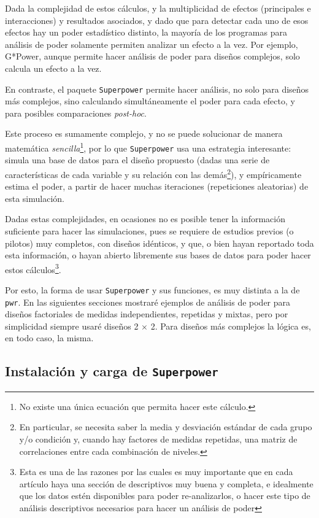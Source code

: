 \documentclass[
]{article}
\begin{document}
Dada la complejidad de estos cálculos, y la multiplicidad de efectos
(principales e interacciones) y resultados asociados, y dado que para
detectar cada uno de esos efectos hay un poder estadístico distinto, la
mayoría de los programas para análisis de poder solamente permiten
analizar un efecto a la vez. Por ejemplo, G*Power, aunque permite hacer
análisis de poder para diseños complejos, solo calcula un efecto a la
vez.

En contraste, el paquete \texttt{Superpower} permite hacer análisis, no
solo para diseños más complejos, sino calculando simultáneamente el
poder para cada efecto, y para posibles comparaciones \emph{post-hoc}.

Este proceso es sumamente complejo, y no se puede solucionar de manera
matemática \emph{sencilla}\footnote{No existe una única ecuación que
  permita hacer este cálculo.}, por lo que \texttt{Superpower} usa una
estrategia interesante: simula una base de datos para el diseño
propuesto (dadas una serie de características de cada variable y su
relación con las demás\footnote{En particular, se necesita saber la
  media y desviación estándar de cada grupo y/o condición y, cuando hay
  factores de medidas repetidas, una matriz de correlaciones entre cada
  combinación de niveles.}), y empíricamente estima el poder, a partir
de hacer muchas iteraciones (repeticiones aleatorias) de esta
simulación.

Dadas estas complejidades, en ocasiones no es posible tener la
información suficiente para hacer las simulaciones, pues se requiere de
estudios previos (o pilotos) muy completos, con diseños idénticos, y
que, o bien hayan reportado toda esta información, o hayan abierto
libremente sus bases de datos para poder hacer estos
cálculos\footnote{Esta es una de las razones por las cuales es muy
  importante que en cada artículo haya una sección de descriptivos muy
  buena y completa, e idealmente que los datos estén disponibles para
  poder re-analizarlos, o hacer este tipo de análisis descriptivos
  necesarios para hacer un análisis de poder}.

Por esto, la forma de usar \texttt{Superpower} y sus funciones, es muy
distinta a la de \texttt{pwr}. En las siguientes secciones mostraré
ejemplos de análisis de poder para diseños factoriales de medidas
independientes, repetidas y mixtas, pero por simplicidad siempre usaré
diseños 2 \(\times\) 2. Para diseños más complejos la lógica es, en todo
caso, la misma.

\hypertarget{instalaciuxf3n-y-carga-de-superpower}{%
\subsection{\texorpdfstring{Instalación y carga de
\texttt{Superpower}}{Instalación y carga de Superpower}}\label{instalaciuxf3n-y-carga-de-superpower}}
\end{document}
